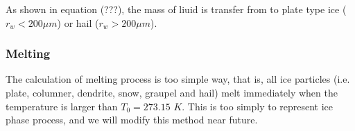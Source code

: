  As shown in equation (???), the mass of liuid is transfer from to plate type ice ($r_{w}<200\mu m$) or hail ($r_{w}>200\mu m$).

\subsubsection{Melting}
The calculation of melting process is too simple way, that is, all ice particles (i.e. plate, columner, dendrite, snow, graupel and hail) melt immediately when the temperature is larger than $T_{0}=273.15$ $K$. This is too simply to represent ice phase process, and we will modify this method near future.
 
